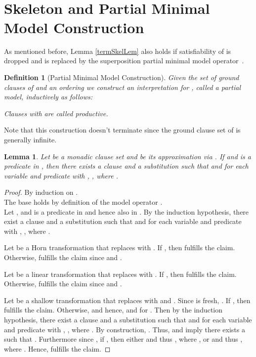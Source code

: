 \documentclass{llncs}
\newtheorem{defin}{Definition}
\newtheorem{lem}[theorem]{Lemma}
\begin{document}



\clearpage
\appendix






\ \\
\ \\
\ \\
\ \\
\ \\
\ \\

\section{Skeleton and Partial Minimal Model Construction}

As mentioned before, Lemma \ref{termSkelLem} also holds if satisfiability of  is dropped and  is replaced
by the superposition partial minimal model operator~\cite{Weidenbach01handbook}.

\begin{defin}[Partial Minimal Model Construction]
Given the set of ground clauses  of  and an ordering  we construct an interpretation  for , called a partial model,  inductively as follows:

Clauses  with  are called productive.
\end{defin}

Note that this construction doesn't terminate since the ground clause set of  is generally infinite.



\begin{lem}\label{termSkelLem3}
Let  be a monadic clause set and  be its approximation via  . 
If   and  is a predicate in , then there exists a clause 
 and a substitution  such that
 and for each variable  and predicate  with , , where .
\end{lem}

\begin{proof}
By induction on .\\
The base  holds by definition of the model operator . \\
Let  ,  and  is a predicate in  and hence also in . 
By the induction hypothesis, there exist a clause  and a substitution  such that
 and for each variable  and predicate  with , , where .

Let  be a Horn transformation that replaces  with .
If , then  fulfills the claim.
Otherwise,  fulfills the claim since  and .

Let  be a linear transformation that replaces  with .
If , then  fulfills the claim.
Otherwise,  fulfills the claim since  and .

Let  be a shallow transformation that replaces  with  and .
Since  is fresh, .
If , then  fulfills the claim.
Otherwise,  and hence,  and  for .
Then by the induction hypothesis, there exist a clause  and a substitution  such that
 and for each variable  and predicate  with , , where .
By construction, . 
Thus,   and  imply there exists a  such that .
Furthermore since , if , then 
either  and thus  , where , or 
 and thus  , where .
Hence,   fulfills the claim.
\end{proof}
\end{document}
